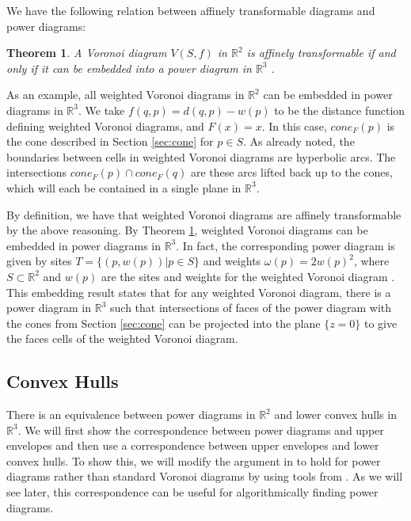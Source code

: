 \documentclass[a4paper, 11pt]{article}
\newtheorem{theorem}{Theorem}[section]
\newcommand{\R}{\mathbb{R}}
\begin{document}
We have the following relation between affinely transformable diagrams and power diagrams:

\begin{theorem}
  \label{thm:affine}
  A Voronoi diagram $V(S,f)$ in $\R^2$ is affinely transformable if and only if it can be embedded into a power diagram in $\R^3$
  \cite{aurenhammer_additive}.
\end{theorem}

As an example, all weighted Voronoi diagrams in $\R^2$ can be embedded in power diagrams in $\R^3$. We take $f(q,p) = d(q,p) - w(p)$ to be the
distance function defining weighted Voronoi diagrams, and $F(x) = x$. In this case, $cone_F(p)$ is the cone described in Section \ref{sec:cone} for $p \in
S$. As already noted, the boundaries between cells in weighted Voronoi diagrams are hyperbolic arcs. The intersections $cone_F(p) \cap cone_F(q)$
are these arcs lifted back up to
the cones, which will each be contained in a single plane in $\R^3$.

By definition, we have that weighted Voronoi diagrams are affinely transformable by the above reasoning. By Theorem \ref{thm:affine}, weighted Voronoi
diagrams can be embedded in power diagrams in $\R^3$. In fact, the corresponding power diagram is given by sites $T = \{ (p, w(p)) | p \in S \}$ and
weights $\omega(p) = 2 w(p)^2$, where $S \subset \R^2$ and $w(p)$ are the sites and weights for the weighted Voronoi diagram
\cite{aurenhammer_additive}. This embedding result states that for any weighted Voronoi diagram, there is a power diagram in $\R^3$ such that
intersections of faces of the power diagram with the cones from Section \ref{sec:cone} can be projected into the plane $\{ z = 0 \}$ to give the faces
cells of the weighted Voronoi diagram.

\subsection{Convex Hulls}
\label{sec:conv}

There is an equivalence between power diagrams in $\R^2$ and lower convex hulls in $\R^3$. We will first show the correspondence between power diagrams and
upper envelopes and then use a correspondence between upper envelopes and lower convex hulls. To show this, we will modify the argument in
\cite{comp_geom} to hold for power diagrams rather than standard Voronoi diagrams by using tools from \cite{aurenhammer_power}. As we will see later, this correspondence can be useful
for algorithmically finding power diagrams.
\end{document}

